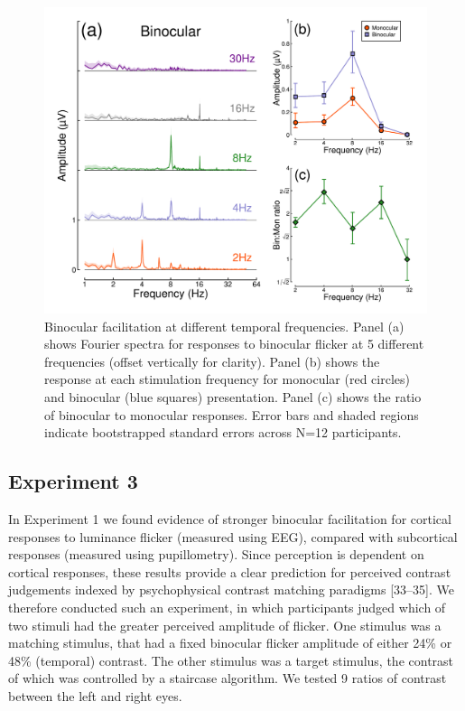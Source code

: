 \documentclass[
]{article}
\begin{document}
\begin{figure}

{\centering \includegraphics{Figures/TFdata} 

}

\caption{Binocular facilitation at different temporal frequencies. Panel (a) shows Fourier spectra for responses to binocular flicker at 5 different frequencies (offset vertically for clarity). Panel (b) shows the response at each stimulation frequency for monocular (red circles) and binocular (blue squares) presentation. Panel (c) shows the ratio of binocular to monocular responses. Error bars and shaded regions indicate bootstrapped standard errors across N=12 participants.}\label{fig:TFdata}
\end{figure}

\hypertarget{experiment-3}{%
\subsection{Experiment 3}\label{experiment-3}}

In Experiment 1 we found evidence of stronger binocular facilitation for cortical responses to luminance flicker (measured using EEG), compared with subcortical responses (measured using pupillometry). Since perception is dependent on cortical responses, these results provide a clear prediction for perceived contrast judgements indexed by psychophysical contrast matching paradigms {[}33--35{]}. We therefore conducted such an experiment, in which participants judged which of two stimuli had the greater perceived amplitude of flicker. One stimulus was a matching stimulus, that had a fixed binocular flicker amplitude of either 24\% or 48\% (temporal) contrast. The other stimulus was a target stimulus, the contrast of which was controlled by a staircase algorithm. We tested 9 ratios of contrast between the left and right eyes.
\end{document}
